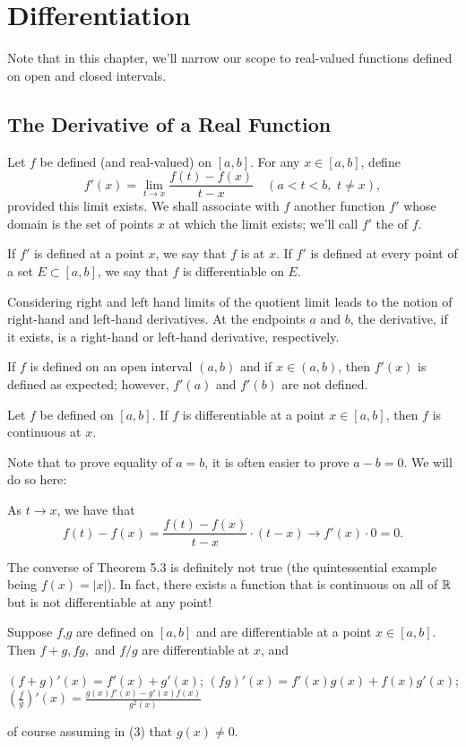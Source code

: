 \documentclass{article}
\begin{document}
\section{Differentiation}
Note that in this chapter, we'll narrow our scope to real-valued functions defined on open and closed intervals.
\subsection{The Derivative of a Real Function}
\begin{definition}
    Let $f$ be defined (and real-valued) on $[a,b]$. For any $x\in[a,b]$, define
    \[f'(x)=\lim_{t\rightarrow x}\frac{f(t)-f(x)}{t-x}\quad(a<t<b,\,\,t\neq x),\]provided this limit exists. We shall associate with $f$ another function $f'$ whose domain is the set of points $x$ at which the limit exists; we'll call $f'$ the  of $f$.

    If $f'$ is defined at a point $x$, we say that $f$ is  at $x$. If $f'$ is defined at every point of a set $E\subset[a,b]$, we say that $f$ is differentiable on $E$. 
\end{definition}
\begin{remark}
    Considering right and left hand limits of the quotient limit leads to the notion of right-hand and left-hand derivatives. At the endpoints $a$ and $b$, the derivative, if it exists, is a right-hand or left-hand derivative, respectively. 

    If $f$ is defined on an open interval $(a,b)$ and if $x\in (a,b)$, then $f'(x)$ is defined as expected; however, $f'(a)$ and $f'(b)$ are not defined.
\end{remark}
\begin{theorem}
    Let $f$ be defined on $[a,b]$. If $f$ is differentiable at a point $x\in [a,b]$, then $f$ is continuous at $x$.
\end{theorem}
\begin{remark}
    Note that to prove equality of $a=b$, it is often easier to prove $a-b=0$. We will do so here:

    As $t\rightarrow x$, we have that
    \[f(t)-f(x)=\frac{f(t)-f(x)}{t-x}\cdot (t-x)\rightarrow f'(x)\cdot 0=0.\]
\end{remark}
The converse of Theorem 5.3 is definitely not true (the quintessential example being $f(x)=|x|$). In fact, there exists a function that is continuous on all of $\mathbb R$ but is not differentiable at any point!
\begin{theorem}
    Suppose $f$,$g$ are defined on $[a,b]$ and are differentiable at a point $x\in [a,b]$. Then $f+g,fg,$ and $f/g$ are differentiable at $x$, and 
    \begin{enumerate}
        \ii $(f+g)'(x)=f'(x)+g'(x)$;
        \ii $(fg)'(x)=f'(x)g(x)+f(x)g'(x)$;
        \ii $\left(\frac{f}{g}\right)'(x)=\frac{g(x)f'(x)-g'(x)f(x)}{g^{2}(x)}$
    \end{enumerate}
    of course assuming in (3) that $g(x)\neq 0$.
\end{theorem}
\end{document}
